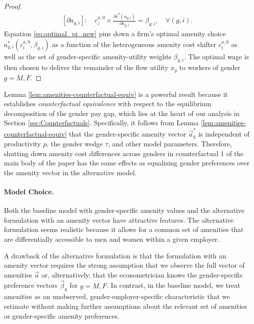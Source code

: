 \begin{proof}
    \begin{align}
        \left[\partial a_{g,i}\right]:\quad c_{i}^{a,0}\times\frac{\partial\tilde{c}^{a}\left(a_{g,i}\right)}{\partial a_{g,i}}=\beta_{g,i},\quad\forall\left(g,i\right). \label{eq:optimal_pi_new}
    \end{align}
    Equation \eqref{eq:optimal_pi_new} pins down a firm's optimal amenity choice $a_{g,i}^{*}(c_{i}^{a,0},\beta_{g,i})$ as a function of the heterogeneous amenity cost shifter $c_{i}^{a,0}$ as well as the set of gender-specific amenity-utility weights $\beta_{g,i}$. The optimal wage is then chosen to deliver the remainder of the flow utility $x_{g}$ to workers of gender $g = M, F$.
\end{proof}
%
Lemma \ref{lem:amenities-counterfactual-equiv} is a powerful result because it establishes \emph{counterfactual equivalence} with respect to the equilibrium decomposition of the gender pay gap, which lies at the heart of our analysis in Section \ref{sec:Counterfactuals}. Specifically, it follows from Lemma
\ref{lem:amenities-counterfactual-equiv} that the gender-specific amenity vector $\vec{a}_g^{*}$ is independent of productivity $p$, the gender wedge $\tau$, and other model parameters. Therefore, shutting down amenity cost differences across genders in counterfactual 1 of the main body of the paper has the same effects as equalizing gender preferences over the amenity vector in the alternative model.


\paragraph{Model Choice.}

Both the baseline model with gender-specific amenity values and the alternative formulation with an amenity vector have attractive features. The alternative formulation seems realistic because it allows for a common set of amenities that are differentially accessible to men and women within a given employer.

A drawback of the alternative formulation is that the formulation with an amenity vector requires the strong assumption that we observe the full vector of amenities $\vec{a}$ or, alternatively, that the econometrician knows the gender-specific preference vectors $\vec{\beta}_{g}$ for $g = M, F$. In contrast, in the baseline model, we treat amenities as an unobserved, gender-employer-specific characteristic that we estimate without making further assumptions about the relevant set of amenities or gender-specific amenity preferences.

